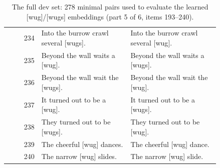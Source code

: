 \begin{table}[p]
\begin{tabular}{@{}rp{0.42\linewidth}p{0.42\linewidth}@{}}
234 & Into the burrow crawl several {[}wugs{]}. & Into the burrow crawl several {[}wug{]}. \\
235 & Beyond the wall waits a {[}wug{]}. & Beyond the wall waits a {[}wugs{]}. \\
236 & Beyond the wall wait the {[}wugs{]}. & Beyond the wall wait the {[}wug{]}. \\
237 & It turned out to be a {[}wug{]}. & It turned out to be a {[}wugs{]}. \\
238 & They turned out to be {[}wugs{]}. & They turned out to be {[}wug{]}. \\
239 & The cheerful {[}wug{]} dances. & The cheerful {[}wug{]} dance. \\
240 & The narrow {[}wug{]} slides. & The narrow {[}wug{]} slide. \\
\hline
\end{tabular}
\caption{The full dev set: 278 minimal pairs used to evaluate the learned {[}wug{]}/{[}wugs{]} embeddings (part 5 of 6, items 193--240).}
\label{tab:dev-set-5}
\end{table}

